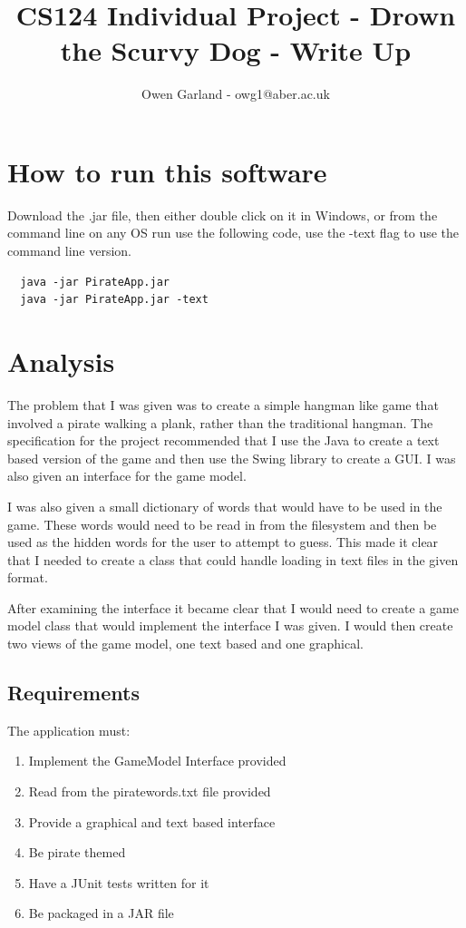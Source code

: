 \documentclass[notitlepage]{report}
\makeatletter
\newcommand*{\toccontents}{\@starttoc{toc}}
\makeatother
\begin{document}
\title{CS124 Individual Project  - Drown the Scurvy Dog - Write Up}
\author{Owen Garland - owg1@aber.ac.uk}
\date{}
\maketitle
\toccontents

\section{How to run this software}
Download the .jar file, then either double click on it in Windows, or from the command line on any OS run use the following code, use the -text flag to use the command line version. 

\begin{lstlisting}
  java -jar PirateApp.jar 
  java -jar PirateApp.jar -text
\end{lstlisting}

\section{Analysis}
The problem that I was given was to create a simple hangman like game that involved a pirate walking a plank, rather than the traditional hangman. The specification for the project recommended that I use the Java  to create a text based version of the game and then use the  Swing library to create a GUI. I was also given an interface for the game model. 

I was also given a small dictionary of words that would have to be used in the game. These words would need to be read in from the filesystem and then be used as the hidden words for the user to attempt to guess. This made it clear that I needed to create a class that could handle loading in text files in the given format. 

After examining the interface it became clear that I would need to create a game model class that would implement the interface I was given. I would then create two views of the game model, one text based and one graphical. 


\subsection{Requirements}
The application must: 
\begin{enumerate}
  \item Implement the GameModel Interface provided
  \item Read from the piratewords.txt file provided
  \item Provide a graphical and text based interface
  \item Be pirate themed
  \item Have a JUnit tests written for it
  \item Be packaged in a JAR file
\end{enumerate}
\end{document}
